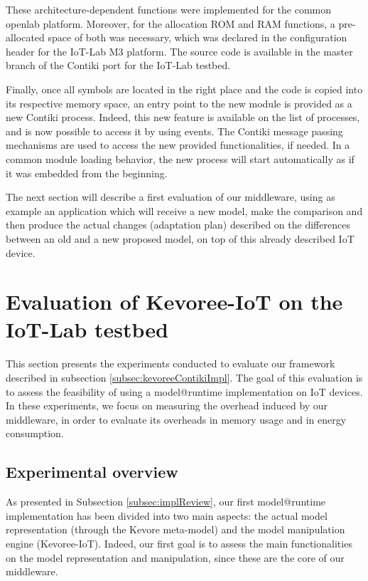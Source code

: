 These architecture-dependent functions were implemented for the common openlab platform.
Moreover, for the allocation ROM and RAM functions, a pre-allocated space of both was necessary, which was declared in the configuration header for the IoT-Lab M3 platform.
The source code is available in the master branch of the Contiki port for the IoT-Lab testbed.

Finally, once all symbols are located in the right place and the code is copied into its respective memory space, an entry point to the new module is provided as a new Contiki process.
Indeed, this new feature is available on the list of processes, and is now possible to access it by using events.
The Contiki message passing mechanisms are used to access the new provided functionalities, if needed.
In a common module loading behavior, the new process will start automatically as if it was embedded from the beginning.

The next section will describe a first evaluation of our middleware, using as example an application which will receive a new model, make the comparison and then produce the actual changes (adaptation plan) described on the differences between an old and a new proposed model, on top of this already described IoT device.

\section{Evaluation of Kevoree-IoT on the IoT-Lab testbed}
This section presents the experiments conducted to evaluate our framework described in subsection \ref{subsec:kevoreeContikiImpl}.
The goal of this evaluation is to assess the feasibility of using a model@runtime implementation on IoT devices.
In these experiments, we focus on measuring the overhead induced by our middleware, in order to evaluate its overheads in memory usage and in energy consumption.

\subsection{Experimental overview}
As presented in Subsection \ref{subsec:implReview}, our first model@runtime implementation has been divided into two main aspects: the actual model representation (through the Kevore meta-model) and the model manipulation engine (Kevoree-IoT).
Indeed, our first goal is to assess the main functionalities on the model representation and manipulation, since these are the core of our middleware.


